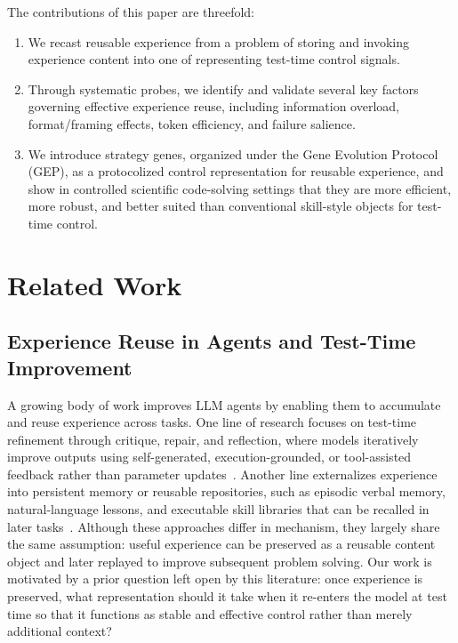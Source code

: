 \documentclass{article}
\begin{document}
The contributions of this paper are threefold:
\begin{enumerate}[leftmargin=1.5em,itemsep=0pt,topsep=2pt]
    \item We recast reusable experience from a problem of storing and invoking experience content into one of representing test-time control signals.
    \item Through systematic probes, we identify and validate several key factors governing effective experience reuse, including information overload, format/framing effects, token efficiency, and failure salience.
    \item We introduce strategy genes, organized under the Gene Evolution Protocol (GEP), as a protocolized control representation for reusable experience, and show in controlled scientific code-solving settings that they are more efficient, more robust, and better suited than conventional skill-style objects for test-time control.
\end{enumerate}


\section{Related Work}
\label{sec:related_work}

\subsection{Experience Reuse in Agents and Test-Time Improvement}

A growing body of work improves LLM agents by enabling them to accumulate and reuse experience across tasks. 
One line of research focuses on test-time refinement through critique, repair, and reflection, where models iteratively improve outputs using self-generated, execution-grounded, or tool-assisted feedback rather than parameter updates~\cite{Self-Refine,CRITIC,Self-Debug}. 
Another line externalizes experience into persistent memory or reusable repositories, such as episodic verbal memory, natural-language lessons, and executable skill libraries that can be recalled in later tasks~\cite{Reflexion,ExpeL,Voyager}. 
Although these approaches differ in mechanism, they largely share the same assumption: useful experience can be preserved as a reusable content object and later replayed to improve subsequent problem solving. 
Our work is motivated by a prior question left open by this literature: once experience is preserved, what representation should it take when it re-enters the model at test time so that it functions as stable and effective control rather than merely additional context?
\end{document}
